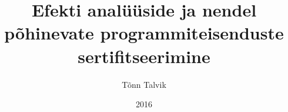 \documentclass{article}
\begin{document}
\title{Efekti analüüside ja nendel põhinevate programmiteisenduste sertifitseerimine}
\author{Tõnn Talvik}
\date{2016}

\maketitle
\end{document}
